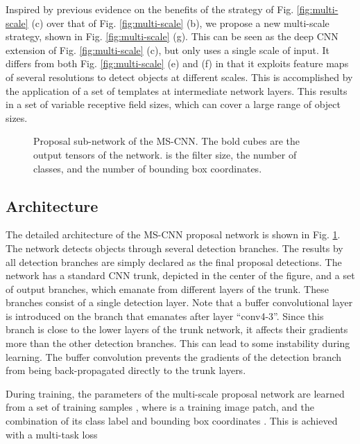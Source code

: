 \documentclass[runningheads]{llncs}
\begin{document}
Inspired by previous evidence  on the benefits of the strategy of
Fig. \ref{fig:multi-scale} (c) over that of
Fig. \ref{fig:multi-scale} (b), we propose a new
multi-scale strategy, shown in Fig. \ref{fig:multi-scale} (g).
This can be seen as the deep CNN  extension of Fig. \ref{fig:multi-scale} (c),
but only uses a single scale of input. It differs from both
Fig. \ref{fig:multi-scale} (e) and (f) in that it exploits feature maps of
several resolutions to detect objects at different scales. This is
accomplished by the application of a set of templates at intermediate
network layers. This results in a set of variable receptive field sizes,
which can cover a large range of object sizes.


\begin{figure}[!t]
\centering
\centerline{}
\caption{Proposal sub-network of the MS-CNN. The bold cubes are the output tensors of the network.  is the filter size,  the number of classes, and  the number of bounding box coordinates.}
\label{fig:framework}
\end{figure}


\subsection{Architecture}
\label{subsec:framework}

The detailed architecture of the MS-CNN proposal network is shown in
Fig. \ref{fig:framework}. The network detects objects through several
detection branches. The results by all detection branches are simply declared as the final proposal detections. The network has a standard CNN trunk, depicted in the center of
the figure, and a set of output branches, which emanate from different
layers of the trunk. These branches consist of a single detection
layer. Note that a buffer convolutional layer is introduced on the
branch that emanates after layer ``conv4-3''. Since this branch is close to
the lower layers of the trunk network, it affects their gradients more than
the other detection branches. This can lead to some instability during
learning. The buffer convolution prevents the gradients of the
detection branch from being back-propagated directly to the trunk layers.

During training, the parameters  of the multi-scale proposal
network are learned from a set of training samples ,
where  is a training image patch, and  the combination of
its class label  and bounding box
coordinates . This is achieved with a
multi-task loss
\end{document}
